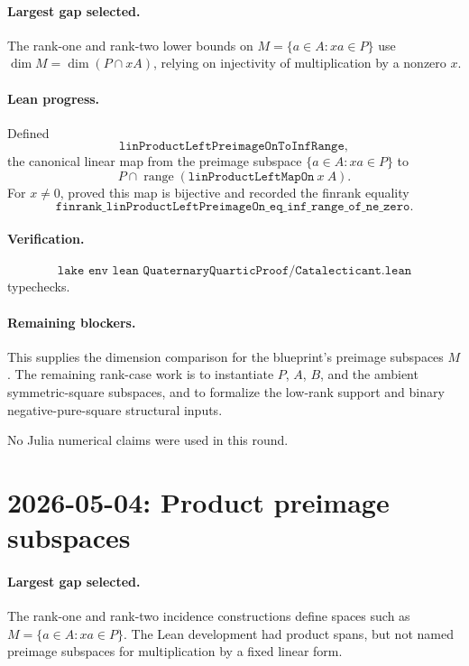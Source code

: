\documentclass[11pt]{article}
\begin{document}
\paragraph{Largest gap selected.}
The rank-one and rank-two lower bounds on \(M=\{a\in A:xa\in P\}\) use
\(\dim M=\dim(P\cap xA)\), relying on injectivity of multiplication by a
nonzero \(x\).

\paragraph{Lean progress.}
Defined
\[
\texttt{linProductLeftPreimageOnToInfRange},
\]
the canonical linear map from the preimage subspace
\(\{a\in A:xa\in P\}\) to
\[
P\cap \operatorname{range}(\texttt{linProductLeftMapOn}\ x\ A).
\]
For \(x\neq0\), proved this map is bijective and recorded the finrank equality
\[
\texttt{finrank\_linProductLeftPreimageOn\_eq\_inf\_range\_of\_ne\_zero}.
\]

\paragraph{Verification.}
\[
\texttt{lake env lean QuaternaryQuarticProof/Catalecticant.lean}
\]
typechecks.

\paragraph{Remaining blockers.}
This supplies the dimension comparison for the blueprint's preimage subspaces
\(M\).  The remaining rank-case work is to instantiate \(P\), \(A\), \(B\),
and the ambient symmetric-square subspaces, and to formalize the low-rank
support and binary negative-pure-square structural inputs.

No Julia numerical claims were used in this round.

\section*{2026-05-04: Product preimage subspaces}

\paragraph{Largest gap selected.}
The rank-one and rank-two incidence constructions define spaces such as
\(M=\{a\in A:xa\in P\}\).  The Lean development had product spans, but not
named preimage subspaces for multiplication by a fixed linear form.
\end{document}
